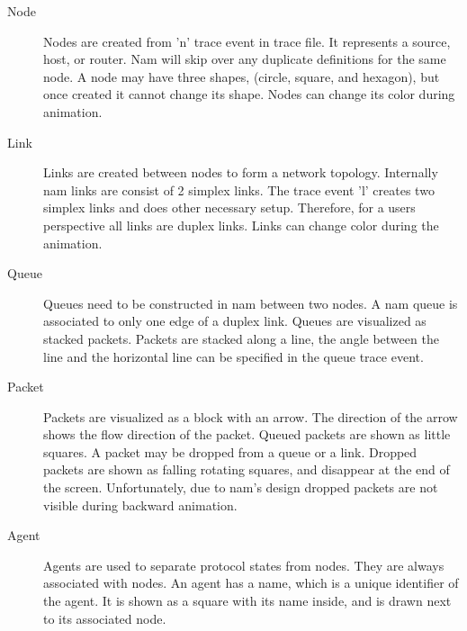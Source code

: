 \begin{description}
\item[Node]
Nodes are created from 'n' trace event in trace file. It represents a source, host, or router. Nam will skip over any duplicate definitions for the same node. A node may have three shapes, (circle, square, and hexagon), but once created it cannot change its shape. Nodes can change its color during animation.

\item[Link]
Links are created between nodes to form a network topology. Internally nam links are consist of 2 simplex links. The trace event 'l' creates two simplex links and does other necessary setup. Therefore, for a users perspective all links are duplex links.  Links can change color during the animation.

\item[Queue]
Queues need to be constructed in nam between two nodes. A nam queue is associated to only one edge of a duplex link. Queues are visualized as stacked packets.  Packets are stacked along a line, the angle between the line and the horizontal line can be specified in the queue trace event.

\item[Packet]
Packets are visualized as a block with an arrow. The direction of the arrow shows the flow direction of the packet. Queued packets are shown as little squares. A packet may be dropped from a queue or a link. Dropped packets are shown as falling rotating squares, and disappear at the end of the screen.  Unfortunately, due to nam's design dropped packets are not visible during backward animation.

\item[Agent]
Agents are used to separate protocol states from nodes. They are always associated with nodes. An agent has a name, which is a unique identifier of the agent. It is shown as a square with its name inside, and is drawn next to its associated node.
\end{description}

